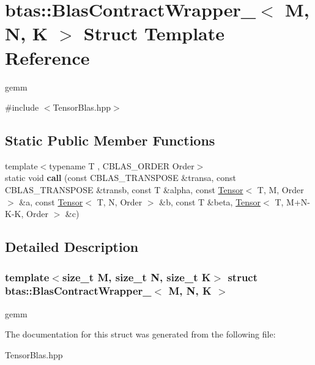 \hypertarget{structbtas_1_1_blas_contract_wrapper__}{
\section{btas::BlasContractWrapper\_\-$<$ M, N, K $>$ Struct Template Reference}
\label{structbtas_1_1_blas_contract_wrapper__}
}


gemm  


{\ttfamily \#include $<$TensorBlas.hpp$>$}\subsection*{Static Public Member Functions}
\begin{DoxyCompactItemize}
\item 
\hypertarget{structbtas_1_1_blas_contract_wrapper___a32adbc405445ff2b30001a6140f412d3}{
{\footnotesize template$<$typename T , CBLAS\_\-ORDER Order$>$ }\\static void {\bfseries call} (const CBLAS\_\-TRANSPOSE \&transa, const CBLAS\_\-TRANSPOSE \&transb, const T \&alpha, const \hyperlink{classbtas_1_1_tensor}{Tensor}$<$ T, M, Order $>$ \&a, const \hyperlink{classbtas_1_1_tensor}{Tensor}$<$ T, N, Order $>$ \&b, const T \&beta, \hyperlink{classbtas_1_1_tensor}{Tensor}$<$ T, M+N-\/K-\/K, Order $>$ \&c)}
\label{structbtas_1_1_blas_contract_wrapper___a32adbc405445ff2b30001a6140f412d3}

\end{DoxyCompactItemize}


\subsection{Detailed Description}
\subsubsection*{template$<$size\_\-t M, size\_\-t N, size\_\-t K$>$ struct btas::BlasContractWrapper\_\-$<$ M, N, K $>$}

gemm 

The documentation for this struct was generated from the following file:\begin{DoxyCompactItemize}
\item 
TensorBlas.hpp\end{DoxyCompactItemize}
